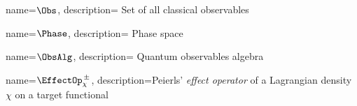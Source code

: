 	{%
		name={\ensuremath{\Obs}},
		description={ Set of all classical observables}
	}

	{%
		name={\ensuremath{\Phase}},
		description={ Phase space}
	}
	
	{%
		name={\ensuremath{\ObsAlg}},
		description={ Quantum observables algebra}
	}
	

	
	{%
		name={\ensuremath{\EffectOp_\chi^{\, \pm}}},
		description={Peierls' \emph{effect operator} of a Lagrangian density $\chi$ on a target functional}
	}